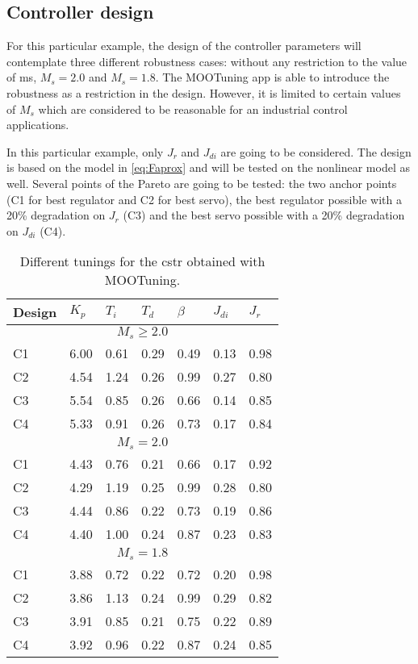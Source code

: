 \subsection{Controller design}
For this particular example, the design of the controller parameters will contemplate three different robustness cases: without any restriction to the value of \gls{ms}, $M_s = 2.0$ and $M_s = 1.8$. The MOOTuning app is able to introduce the robustness as a restriction in the design. However, it is limited to certain values of $M_s$ which are considered to be reasonable for an industrial control applications.

In this particular example, only $J_{r}$ and $J_{di}$ are going to be considered. The design is based on the model in \eqref{eq:Faprox} and will be tested on the nonlinear model as well. Several points of the Pareto are going to be tested: the two anchor points (C1 for best regulator and C2 for best servo), the best regulator possible with a 20\% degradation on $J_r$ (C3) and the best servo possible with a 20\% degradation on $J_{di}$ (C4).
%
\begin{table}[tb]
	\caption{Different tunings for the \gls{cstr} obtained with MOOTuning.}
	\centering
	\begin{tabular}{m{1cm}m{1cm}m{1cm}m{1cm}m{1cm}m{1cm}m{1cm}}
		\toprule
		Design & $K_p$ & $T_i$ & $T_d$ & $\beta$ & $J_{di}$ & $J_r$ \\
		\midrule
		\multicolumn{7}{c}{$M_s \geq 2.0$} \\
		\midrule
		C1 & 6.00 & 0.61 & 0.29 & 0.49 & 0.13 & 0.98\\
		C2 & 4.54 & 1.24 & 0.26 & 0.99 & 0.27 & 0.80\\
		C3 & 5.54 & 0.85 & 0.26 & 0.66 & 0.14 & 0.85\\
		C4 & 5.33 & 0.91 & 0.26 & 0.73 & 0.17 & 0.84\\
		\midrule
		\multicolumn{7}{c}{$M_s = 2.0$} \\
		\midrule
		C1 & 4.43 & 0.76 & 0.21 & 0.66 & 0.17 & 0.92\\
		C2 & 4.29 & 1.19 & 0.25 & 0.99 & 0.28 & 0.80\\
		C3 & 4.44 & 0.86 & 0.22 & 0.73 & 0.19 & 0.86\\
		C4 & 4.40 & 1.00 & 0.24 & 0.87 & 0.23 & 0.83\\
		\midrule
		\multicolumn{7}{c}{$M_s = 1.8$} \\
		\midrule
		C1 & 3.88 & 0.72 & 0.22 & 0.72 & 0.20 & 0.98\\
		C2 & 3.86 & 1.13 & 0.24 & 0.99 & 0.29 & 0.82\\
		C3 & 3.91 & 0.85 & 0.21 & 0.75 & 0.22 & 0.89\\
		C4 & 3.92 & 0.96 & 0.22 & 0.87 & 0.24 & 0.85\\
		\bottomrule
	\end{tabular}
	\label{tab:CSTRDesigns}
\end{table}

